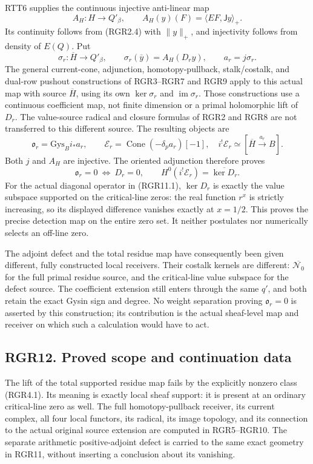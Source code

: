 RTT6 supplies the continuous injective anti-linear map \[
 A_H:H\longrightarrow Q'_\beta,\qquad
 A_H(y)(F)=\langle EF,\mathsf Jy\rangle_+.
 \tag{RGR11.2}
\] Its continuity follows from (RGR2.4) with \(\|y\|_+\), and
injectivity follows from density of \(E(Q)\). Put \[
 \sigma_r:\overline H\to Q'_\beta,\qquad
 \sigma_r(\overline y)=A_H(D_r y),\qquad a_r=j\sigma_r.
 \tag{RGR11.3}
\] The general current-cone, adjunction, homotopy-pullback,
stalk/costalk, and dual-row pushout constructions of RGR3--RGR7 and RGR9
apply to this actual map with source \(\overline H\), using its own
\(\ker\sigma_r\) and \(\operatorname{im}\sigma_r\). Those constructions
use a continuous coefficient map, not finite dimension or a primal
holomorphic lift of \(D_r\). The value-source radical and closure
formulas of RGR2 and RGR8 are not transferred to this different source.
The resulting objects are \[
 \mathfrak o_r=\mathrm{Gys}_B i_*a_r,\qquad
 \mathscr E_r=\operatorname{Cone}(-\delta_p a_r)[-1],
 \quad i^!\mathscr E_r\simeq[\overline H\xrightarrow{a_r}B].
 \tag{RGR11.4}
\] Both \(j\) and \(A_H\) are injective. The oriented adjunction
therefore proves \[
 \mathfrak o_r=0\ \Longleftrightarrow\ D_r=0,
 \qquad H^0(i^!\mathscr E_r)=\overline{\ker D_r}.
 \tag{RGR11.5}
\] For the actual diagonal operator in (RGR11.1), \(\ker D_r\) is
exactly the value subspace supported on the critical-line zeros: the
real function \(r^x\) is strictly increasing, so its displayed
difference vanishes exactly at \(x=1/2\). This proves the precise
detection map on the entire zero set. It neither postulates nor
numerically selects an off-line zero.

The adjoint defect and the total residue map have consequently been
given different, fully constructed local receivers. Their costalk
kernels are different: \(\overline{\mathcal N_0}\) for the full primal
residue source, and the critical-line value subspace for the defect
source. The coefficient extension still enters through the same \(q'\),
and both retain the exact Gysin sign and degree. No weight separation
proving \(\mathfrak o_r=0\) is asserted by this construction; its
contribution is the actual sheaf-level map and receiver on which such a
calculation would have to act.

\subsection{RGR12. Proved scope and continuation
data}\label{rgr12.-proved-scope-and-continuation-data}

The lift of the total supported residue map fails by the explicitly
nonzero class (RGR4.1). Its meaning is exactly local sheaf support: it
is present at an ordinary critical-line zero as well. The full
homotopy-pullback receiver, its current complex, all four local
functors, its radical, its image topology, and its connection to the
actual original source extension are computed in RGR5--RGR10. The
separate arithmetic positive-adjoint defect is carried to the same exact
geometry in RGR11, without inserting a conclusion about its vanishing.

